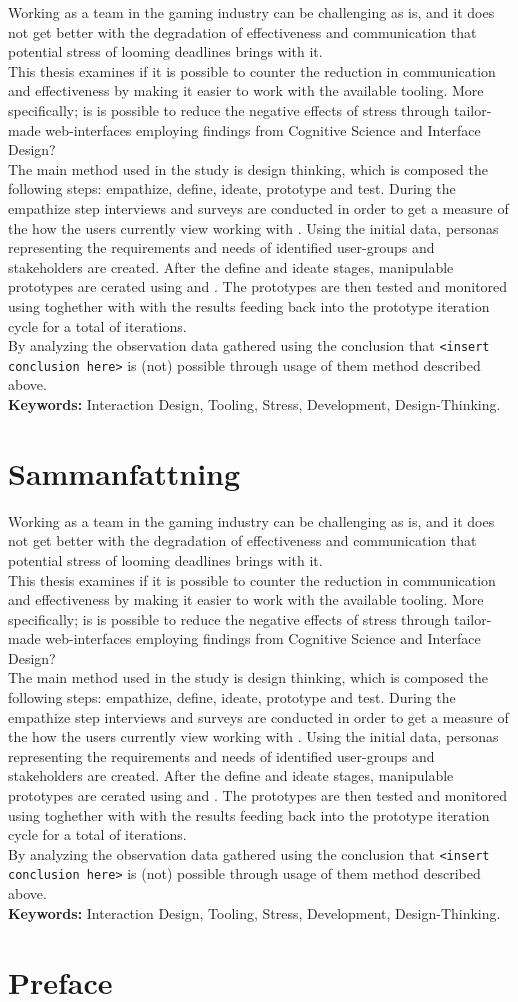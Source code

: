\documentclass[a4paper,11pt]{article}
\newcounter{counterTODO}\setcounter{counterTODO}{1}
\newcommand\TODO[2][]{%
  \ifshowTodo{%
    \def\varTODOtext{\textcolor{purple}{\texttt{<}\textbf{TODO}\#\arabic{counterTODO}\texttt{: #2>}}}
    \def\varTODOContentLine{\textcolor{purple}{#2}}
    \ifthenelse{\isempty{#1}}%
      {%
        \addcontentsline{tocTODO}{section}{\vspace{-0.3cm}\varTODOContentLine}%
        \varTODOtext\\%
      }%
      {%
        \addcontentsline{tocTODO}{section}{\vspace{-0.3cm}\sout{\varTODOContentLine}}%
      }%
      \stepcounter{counterTODO}%
  }\fi%
}
\newif\ifshowTodo
\begin{document}
\TODO[]{Write non-mock abstract}
\def\abs{
  Working as a team in the gaming industry can be challenging as is, and it
  does not get better with the degradation of effectiveness and communication
  that potential stress of looming deadlines brings with it. \\

  This thesis examines if it is possible to counter the reduction
  in communication and effectiveness by making it easier to work with the
  available tooling. More specifically; is is possible
  to reduce the negative effects of stress through tailor-made web-interfaces
  employing findings from Cognitive Science and Interface Design? \\

  The main method used in the study is design thinking, which is composed the
  following steps: empathize, define, ideate, prototype and test. During the
  empathize step interviews and surveys are conducted in order to get a measure
  of the how the users currently view working with {\shotgun}.
  Using the initial data, personas representing the requirements and needs of
  identified user-groups and stakeholders are created.
  After the define and ideate stages, manipulable prototypes are cerated using
  {\python} and {\flask}. The prototypes are then tested and monitored using
  {\recordingSystem} toghether with {\reviewProtocol} with the results
  feeding back into the prototype iteration cycle for a total of {\numIterations}
  iterations. \\

  By analyzing the observation data gathered using {\recordingSystem} the
  conclusion that {\texttt{<insert conclusion here>}} is (not) possible through
  usage of them method described above. \\

  \textbf{Keywords:}
    Interaction Design,
    Tooling,
    Stress,
    Development,
    Design-Thinking.
}
{\abs}


\newpage

\section*{Sammanfattning}

\TODO[]{Complete English version \& translate to Swedish}
{\abs}

\newpage

\section*{Preface}
\end{document}

